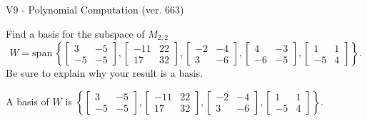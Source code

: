 \begin{exercise}
  \begin{exerciseTitle}V9 - Polynomial Computation (ver. 663)\end{exerciseTitle}
  \begin{exerciseStatement}
    Find a basis for the subspace of \(M_{2,2}\) 
\[W=\mathrm{span}\ \left\{\left[\begin{array}{cc}
3 & -5 \\
-5 & -5
\end{array}\right] , \left[\begin{array}{cc}
-11 & 22 \\
17 & 32
\end{array}\right] , \left[\begin{array}{cc}
-2 & -4 \\
3 & -6
\end{array}\right] , \left[\begin{array}{cc}
4 & -3 \\
-6 & -5
\end{array}\right] , \left[\begin{array}{cc}
1 & 1 \\
-5 & 4
\end{array}\right]\right\}.\]
 Be sure to explain why your result is a basis.


  \end{exerciseStatement}
  \begin{exerciseAnswer}
   A basis of \(W\) is  \(\left\{\left[\begin{array}{cc}
3 & -5 \\
-5 & -5
\end{array}\right] , \left[\begin{array}{cc}
-11 & 22 \\
17 & 32
\end{array}\right] , \left[\begin{array}{cc}
-2 & -4 \\
3 & -6
\end{array}\right] , \left[\begin{array}{cc}
1 & 1 \\
-5 & 4
\end{array}\right]\right\}\).
  


  \end{exerciseAnswer}
\end{exercise}
